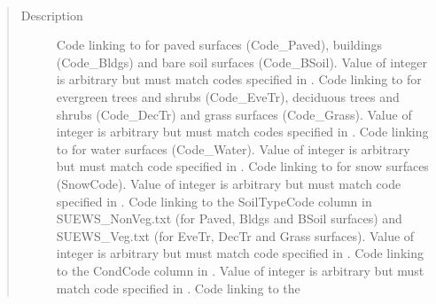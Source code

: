\documentclass[letterpaper,10pt,english]{sphinxmanual}
\begin{document}

\begin{fulllineitems}
\label{\detokenize{input_files/SUEWS_SiteInfo/Input_Options:cmdoption-arg-code}}~\begin{quote}\begin{description}
\item[{Description}] \leavevmode
Code linking to {\hyperref[\detokenize{input_files/SUEWS_SiteInfo/SUEWS_SiteSelect:suews-siteselect-txt}]{}} for paved surfaces (Code\_Paved), buildings (Code\_Bldgs) and bare soil surfaces (Code\_BSoil). Value of integer is arbitrary but must match codes specified in {\hyperref[\detokenize{input_files/SUEWS_SiteInfo/SUEWS_SiteSelect:suews-siteselect-txt}]{}}.  Code linking to {\hyperref[\detokenize{input_files/SUEWS_SiteInfo/SUEWS_SiteSelect:suews-siteselect-txt}]{}} for evergreen trees and shrubs (Code\_EveTr), deciduous trees and shrubs (Code\_DecTr) and grass surfaces (Code\_Grass). Value of integer is arbitrary but must match codes specified in {\hyperref[\detokenize{input_files/SUEWS_SiteInfo/SUEWS_SiteSelect:suews-siteselect-txt}]{}}.  Code linking to {\hyperref[\detokenize{input_files/SUEWS_SiteInfo/SUEWS_SiteSelect:suews-siteselect-txt}]{}} for water surfaces (Code\_Water). Value of integer is arbitrary but must match code specified in {\hyperref[\detokenize{input_files/SUEWS_SiteInfo/SUEWS_SiteSelect:suews-siteselect-txt}]{}}.  Code linking to {\hyperref[\detokenize{input_files/SUEWS_SiteInfo/SUEWS_SiteSelect:suews-siteselect-txt}]{}} for snow surfaces (SnowCode). Value of integer is arbitrary but must match code specified in {\hyperref[\detokenize{input_files/SUEWS_SiteInfo/SUEWS_SiteSelect:suews-siteselect-txt}]{}}.  Code linking to the SoilTypeCode column in SUEWS\_NonVeg.txt (for Paved, Bldgs and BSoil surfaces) and SUEWS\_Veg.txt (for EveTr, DecTr and Grass surfaces). Value of integer is arbitrary but must match code specified in {\hyperref[\detokenize{input_files/SUEWS_SiteInfo/SUEWS_SiteSelect:suews-siteselect-txt}]{}}.  Code linking to the CondCode column in {\hyperref[\detokenize{input_files/SUEWS_SiteInfo/SUEWS_SiteSelect:suews-siteselect-txt}]{}} . Value of integer is arbitrary but must match code specified in {\hyperref[\detokenize{input_files/SUEWS_SiteInfo/SUEWS_SiteSelect:suews-siteselect-txt}]{}}.  Code linking to the 
\end{description}
\end{quote}
\end{fulllineitems}
\end{document}
